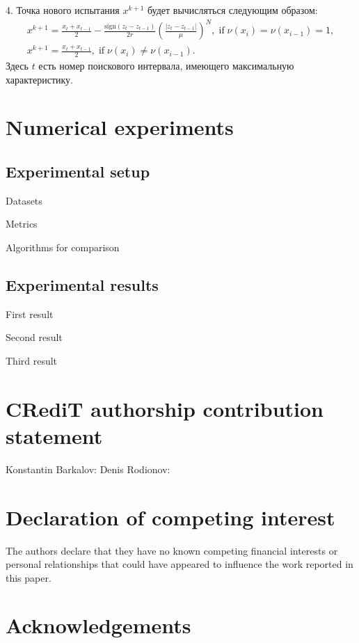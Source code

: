 \documentclass[preprint,12pt]{elsarticle}
\begin{document}
4. Точка нового испытания $x^{k+1}$ будет вычисляться следующим образом:
\begin{gather}\label{xk1_int}
x^{k+1} = \frac{x_t+x_{t-1}}{2}- \frac{\mathrm{sign}(z_t-z_{t-1})}{2r} \left(\frac{\left|z_t-z_{t-1}\right|}{\mu}\right)^N, \; \mathrm{if} \; \nu(x_i) = \nu(x_{i-1}) = 1, \nonumber \\    
x^{k+1} = \frac{x_t+x_{t-1}}{2} , \; \mathrm{if} \; \nu(x_i) \neq \nu(x_{i-1}). \nonumber
\end{gather}
Здесь $t$ есть номер поискового интервала, имеющего максимальную характеристику.

\section{Numerical experiments}
\label{sec_exp}

\subsection{Experimental setup}

Datasets

Metrics

Algorithms for comparison

\subsection{Experimental results}

First result

Second result 

Third result





\section*{CRediT authorship contribution statement}

Konstantin Barkalov:
Denis Rodionov: 


\section*{Declaration of competing interest}

The authors declare that they have no known competing financial interests or personal relationships that could have appeared to influence the work reported in this paper.

\section*{Acknowledgements}
\end{document}
